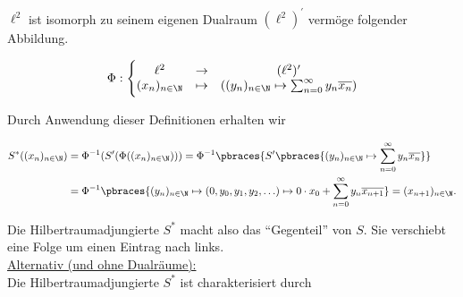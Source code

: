 \begin{solution}
\begin{itemize}
  \begin{center}
   \\
  \end{center}

  $\ell^2$ ist isomorph zu seinem eigenen Dualraum $(\ell^2)^\prime$ vermöge folgender Abbildung.

  \begin{align*}
    \Phi: \Bigg \{
    \begin{matrix}
      \ell^2             &
      \rightarrow        &
      (\ell^2)^\prime \\
      (x_n)_{n \in \N}   &
      \mapsto            &
      ((y_n)_{n \in \N} \mapsto \sum_{n=0}^\infty y_n \overline{x_n})
    \end{matrix}
  \end{align*}

  Durch Anwendung dieser Definitionen erhalten wir

  \begin{align*}
    S^\ast((x_n)_{n \in \N})
    & =
    \Phi^{-1}(S^\prime(\Phi((x_n)_{n \in \N})))
    =
    \Phi^{-1} \pbraces
    {
      S^\prime \pbraces
      {
        (y_n)_{n \in \N}
        \mapsto
        \sum_{n=0}^\infty
        y_n \overline{x_n}
      }
    } \\
    & =
    \Phi^{-1} \pbraces
    {
      (y_n)_{n \in \N}
      \mapsto
      (0, y_0, y_1, y_2, \ldots)
      \mapsto
      0 \cdot x_0 +
      \sum_{n=0}^\infty
      y_n \overline{x_{n+1}}
    }
    =
    (x_{n+1})_{n \in \N}.
  \end{align*}

  Die Hilbertraumadjungierte $S^\ast$ macht also das \enquote{Gegenteil} von $S$.
  Sie verschiebt eine Folge um einen Eintrag nach links. \\

  \underline{Alternativ (und ohne Dualräume):} \\

  Die Hilbertraumadjungierte $S^\ast$ ist charakterisiert durch


\end{itemize}
\end{solution}

